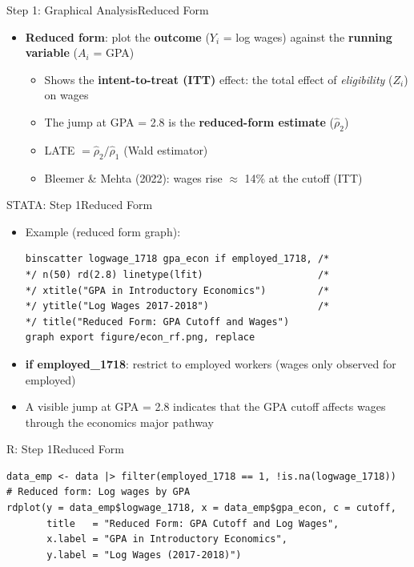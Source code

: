 \documentclass[hyperref={pdfpagelabels=false}]{beamer}
\begin{document}
\begin{frame}{Step 1: Graphical Analysis}{Reduced Form}
	\begin{itemize}
		\item \textbf{Reduced form}: plot the \textbf{outcome} ($Y_i$ = log wages)
		against the \textbf{running variable} ($A_i$ = GPA)
		\vspace{0.2cm}
		\begin{itemize}
			\item Shows the \textbf{intent-to-treat (ITT)} effect:
			the total effect of \emph{eligibility} ($Z_i$) on wages
			\vspace{0.2cm}
			\item The jump at GPA = 2.8 is the \textbf{reduced-form estimate} ($\hat{\rho}_2$)
			\vspace{0.2cm}
			\item LATE $= \hat{\rho}_2 / \hat{\rho}_1$ (Wald estimator)
			\vspace{0.2cm}
			\item Bleemer \& Mehta (2022): wages rise $\approx$ 14\% at the cutoff (ITT)
		\end{itemize}
	\end{itemize}
\end{frame}


\begin{frame}[fragile]{STATA: Step 1}{Reduced Form}
	\begin{itemize}
		\item Example (reduced form graph):
\begin{lstlisting}
binscatter logwage_1718 gpa_econ if employed_1718, /*
*/ n(50) rd(2.8) linetype(lfit)                    /*
*/ xtitle("GPA in Introductory Economics")         /*
*/ ytitle("Log Wages 2017-2018")                   /*
*/ title("Reduced Form: GPA Cutoff and Wages")
graph export figure/econ_rf.png, replace
\end{lstlisting}
		\vspace{0.2cm}
		\item \textbf{if employed\_1718}: restrict to employed workers
		(wages only observed for employed)
		\vspace{0.2cm}
		\item A visible jump at GPA = 2.8 indicates that the GPA cutoff
		affects wages through the economics major pathway
	\end{itemize}
\end{frame}


\begin{frame}[fragile]{R: Step 1}{Reduced Form}
\begin{lstlisting}[style=r-style]
data_emp <- data |> filter(employed_1718 == 1, !is.na(logwage_1718))
# Reduced form: Log wages by GPA
rdplot(y = data_emp$logwage_1718, x = data_emp$gpa_econ, c = cutoff,
       title   = "Reduced Form: GPA Cutoff and Log Wages",
       x.label = "GPA in Introductory Economics",
       y.label = "Log Wages (2017-2018)")
\end{lstlisting}
\end{frame}
\end{document}
